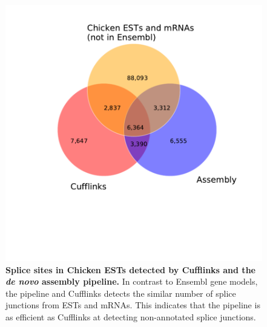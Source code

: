 \documentclass[10pt]{article}
\begin{document}
\begin{figure}[!ht]
\begin{center}
\includegraphics[width=5in]{chick_est_venn.pdf}
\end{center}
\caption{
{\bf Splice sites in Chicken ESTs detected by Cufflinks and the \emph{de novo} assembly pipeline.}
In contrast to Ensembl gene models, the pipeline and Cufflinks detects the similar number of splice junctions
from ESTs and mRNAs. This indicates that the pipeline is as efficient as Cufflinks at detecting
non-annotated splice junctions.
}
\label{chick_est_venn}
\end{figure}
\end{document}

